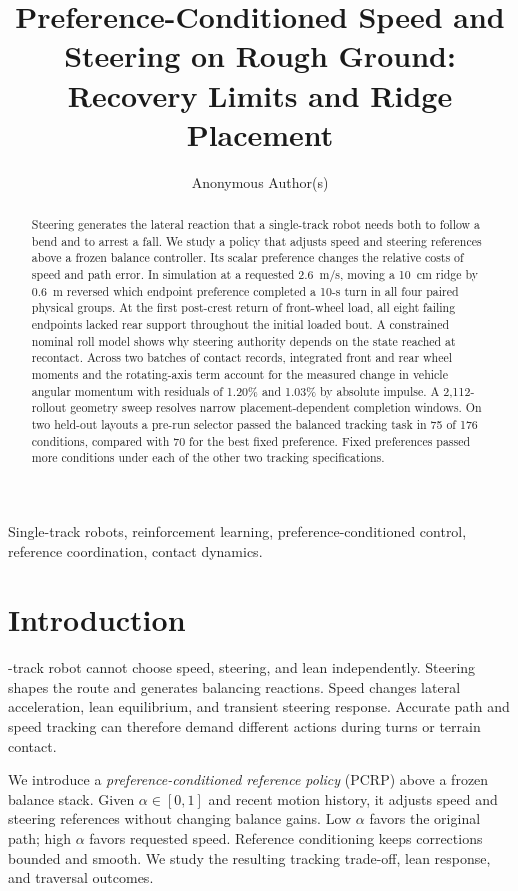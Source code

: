 \documentclass[journal]{IEEEtran}
\title{Preference-Conditioned Speed and Steering on Rough Ground: Recovery Limits and Ridge Placement}
\author{Anonymous Author(s)}
\begin{document}
\maketitle
\begin{abstract}
Steering generates the lateral reaction that a single-track robot needs both to follow a bend and to arrest a fall. We study a policy that adjusts speed and steering references above a frozen balance controller. Its scalar preference changes the relative costs of speed and path error. In simulation at a requested 2.6~m/s, moving a 10~cm ridge by 0.6~m reversed which endpoint preference completed a 10-s turn in all four paired physical groups. At the first post-crest return of front-wheel load, all eight failing endpoints lacked rear support throughout the initial loaded bout. A constrained nominal roll model shows why steering authority depends on the state reached at recontact. Across two batches of contact records, integrated front and rear wheel moments and the rotating-axis term account for the measured change in vehicle angular momentum with residuals of 1.20\% and 1.03\% by absolute impulse. A 2,112-rollout geometry sweep resolves narrow placement-dependent completion windows. On two held-out layouts a pre-run selector passed the balanced tracking task in 75 of 176 conditions, compared with 70 for the best fixed preference. Fixed preferences passed more conditions under each of the other two tracking specifications.
\end{abstract}
\begin{IEEEkeywords}Single-track robots, reinforcement learning, preference-conditioned control, reference coordination, contact dynamics.\end{IEEEkeywords}

\section{Introduction}
-track robot cannot choose speed, steering, and lean independently. Steering shapes the route and generates balancing reactions. Speed changes lateral acceleration, lean equilibrium, and transient steering response. Accurate path and speed tracking can therefore demand different actions during turns or terrain contact.

We introduce a \emph{preference-conditioned reference policy} (PCRP) above a frozen balance stack. Given $\alpha\in[0,1]$ and recent motion history, it adjusts speed and steering references without changing balance gains. Low $\alpha$ favors the original path; high $\alpha$ favors requested speed. Reference conditioning keeps corrections bounded and smooth. We study the resulting tracking trade-off, lean response, and traversal outcomes.
\end{document}
